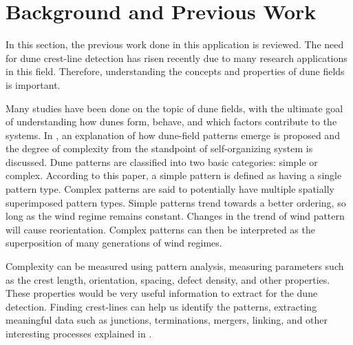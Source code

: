 \section{Background and Previous Work} \label{sec:background_perious_work}

In this section, the previous work done in this application is reviewed. The need for dune crest-line detection has risen recently due to many research applications in this field. Therefore, understanding the concepts and properties of dune fields is important. 


Many studies have been done on the topic of dune fields, with the ultimate goal of understanding how dunes form, behave, and which factors contribute to the systems. In \cite{Kocurek_Ewing}, an explanation of how dune-field patterns emerge is proposed and the degree of complexity from the standpoint of self-organizing system is discussed. Dune patterns are classified into two basic categories: simple or complex. According to this paper, a simple pattern is defined as having a single pattern type. Complex patterns are said to potentially have multiple spatially superimposed pattern types. Simple patterns trend towards a better ordering, so long as the wind regime remains constant. Changes in the trend of wind pattern will cause reorientation. Complex patterns can then be interpreted as the superposition of many generations of wind regimes.

Complexity can be measured using pattern analysis, measuring parameters such as the crest length, orientation, spacing,	defect density, and other properties. These properties would be very useful information to extract for the dune detection. Finding crest-lines	can help us identify the patterns, extracting meaningful data such as junctions, terminations, mergers, linking, and other interesting processes explained in \cite{Kocurek_Ewing}.

